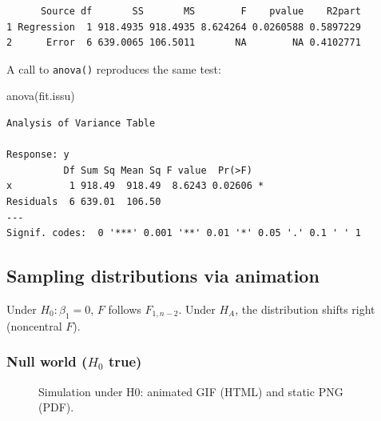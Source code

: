 \documentclass[
  letterpaper,
]{scrbook}
\newenvironment{Shaded}{\begin{snugshade}}{\end{snugshade}}
\newcommand{\FunctionTok}[1]{\textcolor[rgb]{0.28,0.35,0.67}{#1}}
\newcommand{\NormalTok}[1]{\textcolor[rgb]{0.00,0.23,0.31}{#1}}
\begin{document}
\begin{verbatim}
      Source df       SS       MS        F    pvalue    R2part
1 Regression  1 918.4935 918.4935 8.624264 0.0260588 0.5897229
2      Error  6 639.0065 106.5011       NA        NA 0.4102771
\end{verbatim}

A call to \texttt{anova()} reproduces the same test:

\begin{Shaded}
\begin{Highlighting}[]
\FunctionTok{anova}\NormalTok{(fit.issu)}
\end{Highlighting}
\end{Shaded}

\begin{verbatim}
Analysis of Variance Table

Response: y
          Df Sum Sq Mean Sq F value  Pr(>F)  
x          1 918.49  918.49  8.6243 0.02606 *
Residuals  6 639.01  106.50                  
---
Signif. codes:  0 '***' 0.001 '**' 0.01 '*' 0.05 '.' 0.1 ' ' 1
\end{verbatim}

\subsection{Sampling distributions via
animation}\label{sampling-distributions-via-animation}

Under \(H_0:\beta_1=0\), \(F\) follows \(F_{1,n-2}\). Under \(H_A\), the
distribution shifts right (noncentral \(F\)).

\subsubsection{\texorpdfstring{Null world (\(H_0\)
true)}{Null world (H\_0 true)}}\label{null-world-h_0-true}

\begin{figure}


\caption{\label{fig-simulation}Simulation under H0: animated GIF (HTML)
and static PNG (PDF).}

\end{figure}%
\end{document}
